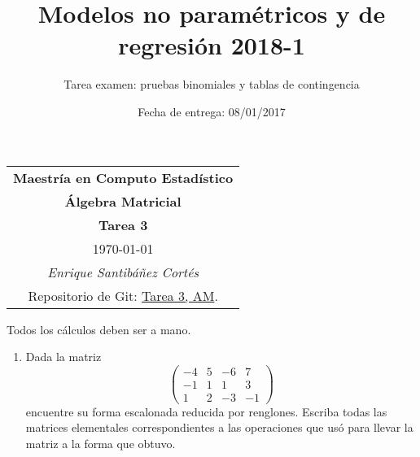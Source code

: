 \documentclass[11pt,letterpaper]{article}
\title{Modelos no paramétricos y de regresión 2018-1}
\author{Tarea examen: pruebas binomiales y tablas de contingencia}
\date{Fecha de entrega: 08/01/2017}
\begin{document}
\begin{table}[ht]
\centering
\begin{tabular}{c}
\textbf{Maestría en Computo Estadístico}\\
\textbf{Álgebra Matricial} \\
\textbf{Tarea 3}\\
\today \\
\emph{Enrique Santibáñez Cortés}\\
Repositorio de Git: \href{https://github.com/Enriquesec/Algebra_matricial/tree/feature/tareas/tareas/Tarea_3}{Tarea 3, AM}.
\end{tabular}
\end{table}
Todos los cálculos deben ser a mano.

\begin{enumerate}
\item Dada la matriz
\begin{equation*}
\left( \begin{array}{rrrr}
-4 & 5 & -6 &7\\
-1 & 1 &  1 &3\\
1  & 2 & -3 &-1
\end{array} \right)
\end{equation*}
encuentre su forma escalonada reducida por renglones. Escriba todas las matrices elementales correspondientes a las operaciones que usó para llevar la matriz a la forma que obtuvo.


\end{enumerate}
\end{document}
